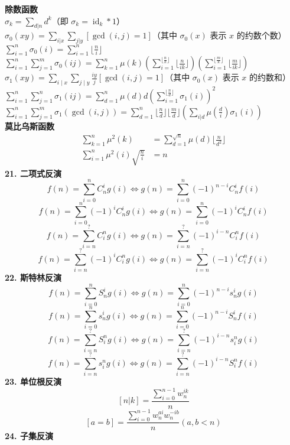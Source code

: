 \textbf{除数函数} \\
$\sigma_{k}=\sum_{d|n}d^{k}$（即 $\sigma_{k}=\operatorname{id}_{k}\ast1$） \\
$\sigma_0(xy)=\sum_{i|x} \sum_{j|y}[\operatorname{gcd}(i,j)=1]$（其中 $\sigma_0(x)$ 表示 $x$ 的约数个数） \\
$\sum_{i=1}^{n}\sigma_0(i)= \sum_{i=1}^{n}\lfloor\frac{n}{i}\rfloor$ \\
$\sum_{i=1}^{n} \sum_{j=1}^{m} \sigma_0(ij)= \sum_{k=1}^{n}\mu(k)\left(\sum_{i=1}^{\lfloor\frac{n}{k}\rfloor}\lfloor{\frac{n}{ik}}\rfloor\right)\left(\sum_{i=1}^{\lfloor\frac{m}{k}\rfloor}\lfloor\frac{m}{i k}\rfloor\right)$\\
$\sigma_{1}(xy)=\sum_{i\mid x}\sum_{j\mid y} \frac{iy}{j}[\gcd(i,j)=1]$（其中 $\sigma_0(x)$ 表示 $x$ 的约数和）\\
$\sum_{i=1}^{n}\sum_{j=1}^{n}\sigma_1(ij)= \sum_{d=1}^{n}\mu(d)d \left(\sum_{i=1}^{\lfloor\frac{n}{d}\rfloor} \sigma_1(i)\right)^{2}$\\
$\sum_{i=1}^{n}\sum_{j=1}^{m} \sigma_1(\gcd(i,j))= \sum_{d=1}^{n}\lfloor\frac{n}{d}\rfloor\lfloor\frac{m}{d}\rfloor\left(\sum_{i|d}\mu(\frac{d}{i}) \sigma_1(i)\right)$\\
\textbf{莫比乌斯函数}
$$
\begin{aligned}
    \sum_{k=1}^{n}\mu^{2}(k)&=\sum_{d=1}^{\sqrt{n}}\mu(d)\lfloor \frac{n}{d^{2}}\rfloor\\
    \sum_{i=1}^{n}\mu^2(i)\sqrt{\frac{n}{i}}&=n
\end{aligned}
$$
\textbf{21. 二项式反演}
$$f(n)=\sum_{i=0}^{n}C_{n}^{i}g(i) \Longleftrightarrow g(n)=\sum_{i=0}^{n}(-1)^{n-i}C_{n}^{i}f(i)$$
$$f(n)=\sum_{i=0}^{n}(-1)^{i}C_{n}^{i}g(i)\Longleftrightarrow g(n)=\sum_{i=0}^{n}(-1)^{i}C_{n}^{i}f(i)$$
$$f(n)=\sum_{i=n}^{?}C_{i}^{n}g(i) \Longleftrightarrow g(n)=\sum_{i=n}^{?}(-1)^{i-n}C_{i}^{n}f(i)$$
$$f(n)=\sum_{i=n}^{?}(-1)^{i}C_{i}^{n}g(i)\Longleftrightarrow g(n)=\sum_{i=n}^{?}(-1)^{i}C_{i}^{n}f(i)$$
\textbf{22. 斯特林反演}
$$f(n)=\sum_{i=0}^{n} S_{n}^{i} g(i) \Longleftrightarrow g(n)=\sum_{i=0}^{n}(-1)^{n-i} s_{n}^{i} g(i)$$
$$f(n)=\sum_{i=0}^{n}s_{n}^{i}g(i)\Longleftrightarrow g(n)=\sum_{i=0}^{n}(-1)^{n-i}S_{n}^{i}f(i)$$
$$f(n)=\sum_{i=n}^{?} S_{i}^{n} g(i) \Longleftrightarrow g(n)=\sum_{i=n}^{?}(-1)^{i-n} s_{i}^{n} g(i)$$
$$f(n)=\sum_{i=n}^{?}s_{i}^{n}g(i)\Longleftrightarrow g(n)=\sum_{i=n}^{?}(-1)^{i-n}S_{i}^{n}f(i)$$
\textbf{23. 单位根反演}
$$[n|k]=\frac{\sum_{i=0}^{n-1}w_{n}^{ik}}{n}$$
$$[a=b]=\frac{\sum_{i=0}^{n-1} w_{n}^{a i} w_{n}^{-i b}}{n}(a,b<n)$$
\textbf{24. 子集反演} \\
